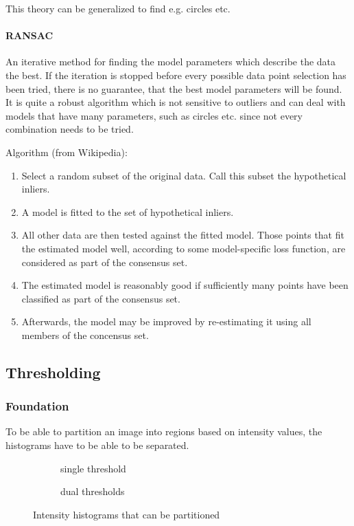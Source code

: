 This theory can be generalized to find e.g. circles etc.

\paragraph{RANSAC}
An iterative method for finding the model parameters which describe the data the best. If the iteration is stopped before every possible data point selection has been tried, there is no guarantee, that the best model parameters will be found. It is quite a robust algorithm which is not sensitive to outliers and can deal with models that have many parameters, such as circles etc. since not every combination needs to be tried.

Algorithm (from Wikipedia):
\begin{enumerate}
  \item Select a random subset of the original data. Call this subset the hypothetical inliers.
  \item A model is fitted to the set of hypothetical inliers.
  \item All other data are then tested against the fitted model. Those points that fit the estimated model well, according to some model-specific loss function, are considered as part of the consensus set.
  \item The estimated model is reasonably good if sufficiently many points have been classified as part of the consensus set.
  \item Afterwards, the model may be improved by re-estimating it using all members of the concensus set.
\end{enumerate}


\subsection{Thresholding}
\subsubsection{Foundation}
To be able to partition an image into regions based on intensity values, the histograms have to be able to be separated.
\begin{figure}[ht!]
	\begin{subfigure}{0.5\textwidth}
		\centering
		
		\caption{single threshold}
	\end{subfigure}
	\begin{subfigure}{0.5\textwidth}
		\centering
		
		\caption{dual thresholds}
	\end{subfigure}
	\caption{Intensity histograms that can be partitioned}
\end{figure}

